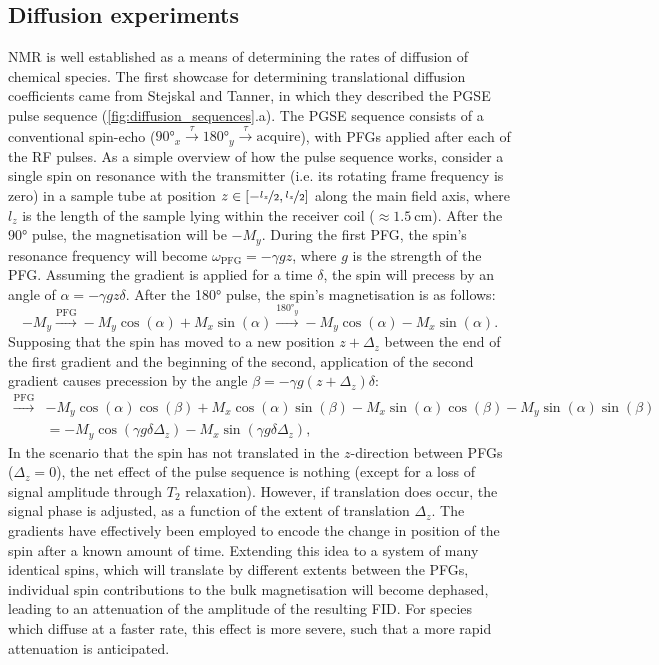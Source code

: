 \subsection{Diffusion experiments}
\label{subsec:diffusion_experiments}
\ac{NMR} is well established as a means of determining the rates of diffusion
of chemical species\cite{Johnson1999,Morris2009b}.
The first showcase for determining translational diffusion coefficients came
from Stejskal and Tanner, in which they described the \ac{PGSE} pulse
sequence\cite{Stejskal1965} (\cref{fig:diffusion_sequences}.a).
The \ac{PGSE} sequence consists of a conventional spin-echo ($\ang{90}_x
\xrightarrow{\tau} \ang{180}_y \xrightarrow{\tau} \text{acquire}$), with
\acp{PFG} applied after each of the \ac{RF} pulses.
As a simple overview of how the pulse sequence works, consider a single spin on
resonance with the transmitter (i.e. its rotating frame frequency is zero) in a
sample tube at position $z \in [-\nicefrac{l_z}{2}, \nicefrac{l_z}{2}]$ along
the main field axis, where $l_z$ is the length of the sample lying within the
receiver coil ($\approx \qty{1.5}{\centi\meter}$).
After the \ang{90} pulse, the magnetisation will be $-M_y$.
During the first \ac{PFG}, the spin's resonance frequency will become
$\omega_{\text{PFG}} = -\gamma g z$, where $g$ is the strength of the \ac{PFG}.
Assuming the gradient is applied for a time $\delta$, the spin will
precess by an angle of  $\alpha = -\gamma g z \delta$. After the \ang{180}
pulse, the spin's magnetisation is as follows:
\[
    -M_y
    \xrightarrow{\text{PFG}} -M_y \cos(\alpha) + M_x \sin(\alpha)
    \xrightarrow{\ang{180}_y} -M_y \cos(\alpha) - M_x \sin(\alpha).
\]
Supposing that the spin has moved to a new position $z + \Delta_z$
between the end of the first gradient and the beginning of the second,
application of the second gradient causes precession by the angle
$\beta = -\gamma g (z + \Delta_z) \delta$:
\begin{equation*}
   \begin{split}
        \xrightarrow{\text{PFG}}
            &-M_y \cos(\alpha)\cos(\beta) +
            M_x \cos(\alpha)\sin(\beta) -
            M_x \sin(\alpha)\cos(\beta) -
            M_y \sin(\alpha)\sin(\beta)\\
        &= -M_y \cos(\gamma g \delta \Delta_z) -
           M_x \sin(\gamma g \delta \Delta_z),
   \end{split}
\end{equation*}
In the scenario that the spin has not translated in the $z$-direction between
\acp{PFG} ($\Delta_z = 0$), the net effect of the pulse sequence is nothing
(except for a loss of signal amplitude through $T_2$ relaxation). However, if
translation does occur, the signal phase is adjusted, as a function of the
extent of translation $\Delta_z$. The gradients have effectively been employed
to encode the change in position of the spin after a known amount of time.
Extending this idea to a system of many identical spins, which will translate
by different extents between the \acp{PFG}, individual spin contributions to
the bulk magnetisation will become dephased, leading to an attenuation of the
amplitude of the resulting \ac{FID}. For species which diffuse at a faster
rate, this effect is more severe, such that a more rapid attenuation is
anticipated.

